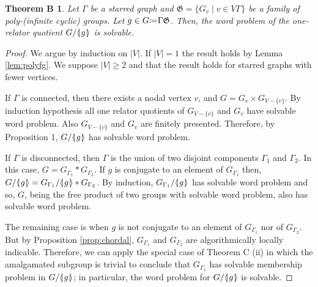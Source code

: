 \documentclass[12pt, a4paper]{amsart}
\newtheorem*{ThmB}{Theorem B}
\theoremstyle{remark}
\theoremstyle{definition}
\begin{document}
\begin{ThmB} Let $\Gamma$ be a starred graph and $\mathfrak{G}=\{G_v\mid v\in V{\Gamma}\}$ be a family of poly-(infinite cyclic) groups.  Let $g\in G{\mathrel{\mathop\mathchar"303A}\mkern-1.2mu=} {\Gamma} \mathfrak{G}$. Then,  the word problem  of the  one-relator quotient $G/{{{\langle}{\mkern-3.7mu}{\lvert}{\mkern1.2mu}{{g}}{\mkern1.2mu}{\rvert}{\mkern-3.7mu}{\rangle}}}$ is solvable.
\end{ThmB} 
\begin{proof}
 We argue by induction on $|V|$. If $|V|=1$ the result holds by Lemma \ref{lem:polyfg}. We suppose $|V|\geq 2$ and that the result holds for starred graphs with fewer vertices.

If ${\Gamma}$ is connected, then there exists a nodal vertex $v$, and $G=G_v\times G_{V-\{v\}}$. By induction hypothesis all one relator quotients of $G_{V-\{v\}}$ and $G_v$ have solvable word problem. Also $G_{V-\{v\}}$ and $G_v$ are finitely presented. Therefore, by Proposition 1, $G/{{\langle}{\mkern-3.7mu}{\lvert}{\mkern1.2mu}{{g}}{\mkern1.2mu}{\rvert}{\mkern-3.7mu}{\rangle}}$ has solvable word problem.

If ${\Gamma}$ is disconnected, then ${\Gamma}$ is the union of two disjoint components ${\Gamma}_1$ and ${\Gamma}_2$. In this case, $G=G_{{\Gamma}_1}*G_{{\Gamma}_2}.$ If $g$ is conjugate to an element of $G_{{\Gamma}_1}$ then, $G/{{\langle}{\mkern-3.7mu}{\lvert}{\mkern1.2mu}{{g}}{\mkern1.2mu}{\rvert}{\mkern-3.7mu}{\rangle}}=G_{{\Gamma}_1}/{{\langle}{\mkern-3.7mu}{\lvert}{\mkern1.2mu}{{g}}{\mkern1.2mu}{\rvert}{\mkern-3.7mu}{\rangle}}*G_{{\Gamma}_2}$. By induction, $G_{{\Gamma}_1}/{{\langle}{\mkern-3.7mu}{\lvert}{\mkern1.2mu}{{g}}{\mkern1.2mu}{\rvert}{\mkern-3.7mu}{\rangle}}$ has solvable word problem and so, $G$, being the free product of two groups with solvable word problem, also has solvable word problem. 

The remaining case is when $g$ is not conjugate to an element of $G_{{\Gamma}_1}$ nor of $G_{{\Gamma}_2}$. But by Proposition \ref{prop:chordal}, $G_{{\Gamma}_1}$ and $G_{{\Gamma}_2}$ are algorithmically locally indicable. Therefore, we can apply the special case of Theorem C (ii) in which the amalgamated subgroup is trivial to conclude that $G_{{\Gamma}_1}$ has solvable membership problem in $G/{{\langle}{\mkern-3.7mu}{\lvert}{\mkern1.2mu}{{g}}{\mkern1.2mu}{\rvert}{\mkern-3.7mu}{\rangle}}$; in particular, the word problem for $G/{{\langle}{\mkern-3.7mu}{\lvert}{\mkern1.2mu}{{g}}{\mkern1.2mu}{\rvert}{\mkern-3.7mu}{\rangle}}$ is solvable.
\end{proof}
\end{document}
